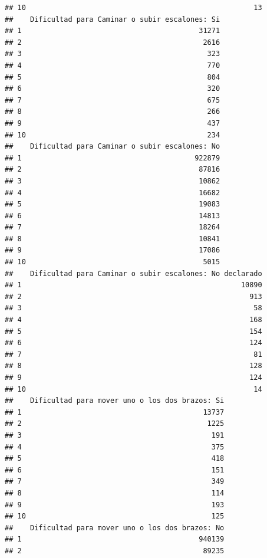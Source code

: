 \documentclass[11pt,]{article}
\begin{document}
\begin{verbatim}
## 10                                                      13
##    Dificultad para Caminar o subir escalones: Si
## 1                                          31271
## 2                                           2616
## 3                                            323
## 4                                            770
## 5                                            804
## 6                                            320
## 7                                            675
## 8                                            266
## 9                                            437
## 10                                           234
##    Dificultad para Caminar o subir escalones: No
## 1                                         922879
## 2                                          87816
## 3                                          10862
## 4                                          16682
## 5                                          19083
## 6                                          14813
## 7                                          18264
## 8                                          10841
## 9                                          17086
## 10                                          5015
##    Dificultad para Caminar o subir escalones: No declarado
## 1                                                    10890
## 2                                                      913
## 3                                                       58
## 4                                                      168
## 5                                                      154
## 6                                                      124
## 7                                                       81
## 8                                                      128
## 9                                                      124
## 10                                                      14
##    Dificultad para mover uno o los dos brazos: Si
## 1                                           13737
## 2                                            1225
## 3                                             191
## 4                                             375
## 5                                             418
## 6                                             151
## 7                                             349
## 8                                             114
## 9                                             193
## 10                                            125
##    Dificultad para mover uno o los dos brazos: No
## 1                                          940139
## 2                                           89235

\end{verbatim}
\end{document}

